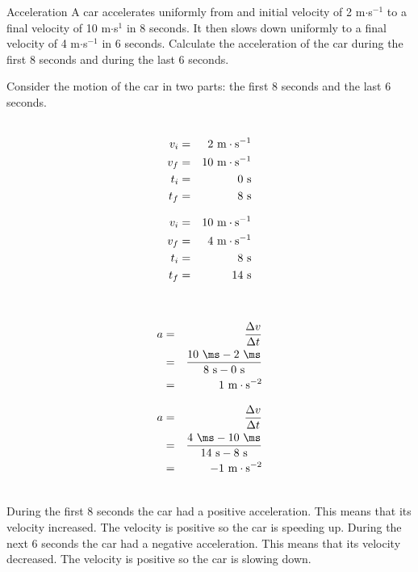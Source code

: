 \begin{wex}{Acceleration}
{A car accelerates uniformly from and initial velocity of 2 m$\cdot$s$^{-1}$ to a final velocity of 10 m$\cdot$s$^1$ in 8 seconds. It then slows down uniformly to a final velocity of 4 m$\cdot$s$^{-1}$ in 6 seconds. Calculate the acceleration of the car during the first 8 seconds and during the last 6 seconds.}
{
Consider the motion of the car in two parts: the first 8 seconds and the last 6 seconds.\\
\\
\begin{minipage}{0.5\textwidth}
\begin{eqnarray*}
v_i &=& 2~\rm{m}\cdot \rm{s}^{-1}\\
v_f &=& 10~\rm{m}\cdot \rm{s}^{-1}\\
t_i &=& 0~\rm{s}\\
t_f &=& 8~\rm{s}
\end{eqnarray*}
\end{minipage}
\begin{minipage}{0.5\textwidth}
\begin{eqnarray*}
v_i &=& 10~\rm{m}\cdot \rm{s}^{-1}\\
v_f &=& 4~\rm{m}\cdot \rm{s}^{-1}\\
t_i &=& 8~\rm{s}\\
t_f &=& 14~\rm{s}
\end{eqnarray*}
\end{minipage}\\

\begin{minipage}{0.5\textwidth}
\begin{eqnarray*}
a &=& \frac{\Delta v}{\Delta t}\\
&=& \frac{10\textrm{ \ms} - 2\textrm{ \ms}}{8\textrm{ s} - 0\textrm{ s}}\\
&=& 1~\rm{m}\cdot \rm{s}^{-2}
\end{eqnarray*}
\end{minipage}
\begin{minipage}{0.5\textwidth}
\begin{eqnarray*}
a &=& \frac{\Delta v}{\Delta t}\\
&=& \frac{4\textrm{ \ms} - 10\textrm{ \ms}}{14\textrm{ s} - 8\textrm{ s}}\\
&=& -1~\rm{m}\cdot \rm{s}^{-2}
\end{eqnarray*}
\end{minipage}\\
During the first 8 seconds the car had a positive acceleration. This means that its velocity increased. The velocity is positive so the car is speeding up.
During the next 6 seconds the car had a negative acceleration. This means that its velocity decreased. The velocity is positive so the car is slowing down.}
\end{wex}

